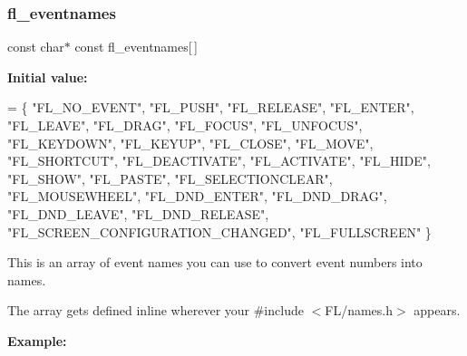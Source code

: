 \subsubsection{\texorpdfstring{fl\+\_\+eventnames}{fl\_eventnames}}
{\footnotesize\ttfamily const char$\ast$ const fl\+\_\+eventnames\mbox{[}$\,$\mbox{]}}

{\bfseries Initial value\+:}
\begin{DoxyCode}
=
\{
  \textcolor{stringliteral}{"FL\_NO\_EVENT"},
  \textcolor{stringliteral}{"FL\_PUSH"},
  \textcolor{stringliteral}{"FL\_RELEASE"},
  \textcolor{stringliteral}{"FL\_ENTER"},
  \textcolor{stringliteral}{"FL\_LEAVE"},
  \textcolor{stringliteral}{"FL\_DRAG"},
  \textcolor{stringliteral}{"FL\_FOCUS"},
  \textcolor{stringliteral}{"FL\_UNFOCUS"},
  \textcolor{stringliteral}{"FL\_KEYDOWN"},
  \textcolor{stringliteral}{"FL\_KEYUP"},
  \textcolor{stringliteral}{"FL\_CLOSE"},
  \textcolor{stringliteral}{"FL\_MOVE"},
  \textcolor{stringliteral}{"FL\_SHORTCUT"},
  \textcolor{stringliteral}{"FL\_DEACTIVATE"},
  \textcolor{stringliteral}{"FL\_ACTIVATE"},
  \textcolor{stringliteral}{"FL\_HIDE"},
  \textcolor{stringliteral}{"FL\_SHOW"},
  \textcolor{stringliteral}{"FL\_PASTE"},
  \textcolor{stringliteral}{"FL\_SELECTIONCLEAR"},
  \textcolor{stringliteral}{"FL\_MOUSEWHEEL"},
  \textcolor{stringliteral}{"FL\_DND\_ENTER"},
  \textcolor{stringliteral}{"FL\_DND\_DRAG"},
  \textcolor{stringliteral}{"FL\_DND\_LEAVE"},
  \textcolor{stringliteral}{"FL\_DND\_RELEASE"},
  \textcolor{stringliteral}{"FL\_SCREEN\_CONFIGURATION\_CHANGED"},
  \textcolor{stringliteral}{"FL\_FULLSCREEN"}
\}
\end{DoxyCode}
This is an array of event names you can use to convert event numbers into names.

The array gets defined inline wherever your \textquotesingle{}\#include $<$F\+L/names.\+h$>$\textquotesingle{} appears.

{\bfseries Example\+:} 
 \mbox{\label{group__fl__events_ga5b66307b326bb1fd02b93b470a7b849d}} 
